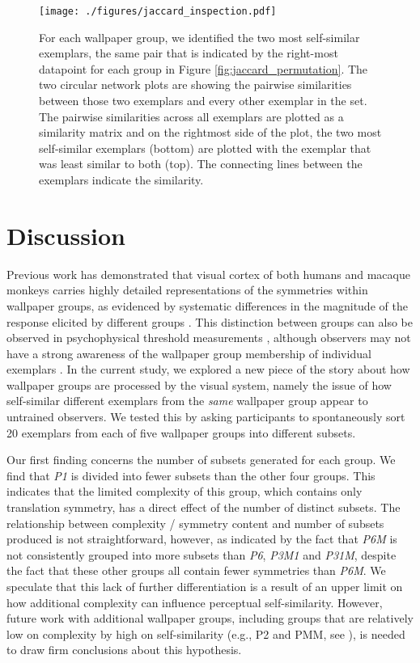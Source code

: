 \documentclass[11pt, twoside]{article}
\begin{document}
\begin{figure}[hbt!]
	\centering
	\texttt{[image: ./figures/jaccard\_inspection.pdf]}
	\caption{For each wallpaper group, we identified the two most self-similar exemplars, the same pair that is indicated by the right-most datapoint for each group in Figure \ref{fig:jaccard_permutation}. The two circular network plots are showing the pairwise similarities between those two exemplars and every other exemplar in the set. The pairwise similarities across all exemplars are plotted as a similarity matrix and on the rightmost side of the plot, the two most self-similar exemplars (bottom) are plotted with the exemplar that was least similar to both (top). The connecting lines between the exemplars indicate the similarity.}
	\label{fig:jaccard_inspection}
\end{figure}

\section*{Discussion}
Previous work has demonstrated that visual cortex of both humans and macaque monkeys carries highly detailed representations of the symmetries within wallpaper groups, as evidenced by systematic differences in the magnitude of the response elicited by different groups \citep{RN1725,kohler_clarke_2021,audurier_symmetry_2021}. This distinction between groups can also be observed in psychophysical threshold measurements \citep{kohler_clarke_2021}, although observers may not have a strong awareness of the wallpaper group membership of individual exemplars \citep{RN172}. In the current study, we explored a new piece of the story about how wallpaper groups are processed by the visual system, namely the issue of how self-similar different exemplars from the \textit{same} wallpaper group appear to untrained observers. We tested this by asking participants to spontaneously sort 20 exemplars from each of five wallpaper groups into different subsets. 

Our first finding concerns the number of subsets generated for each group. We find that \textit{P1} is divided into fewer subsets than the other four groups. This indicates that the limited complexity of this group, which contains only translation symmetry, has a direct effect of the number of distinct subsets. The relationship between complexity / symmetry content and number of subsets produced is not straightforward, however, as indicated by the fact that \textit{P6M} is not consistently grouped into more subsets than \textit{P6}, \textit{P3M1} and \textit{P31M}, despite the fact that these other groups all contain fewer symmetries than \textit{P6M}. We speculate that this lack of further differentiation is a result of an upper limit on how additional complexity can influence perceptual self-similarity. However, future work with additional wallpaper groups, including groups that are relatively low on complexity by high on self-similarity (e.g., P2 and PMM, see \citep{RN172}), is needed to draw firm conclusions about this hypothesis.
\end{document}
